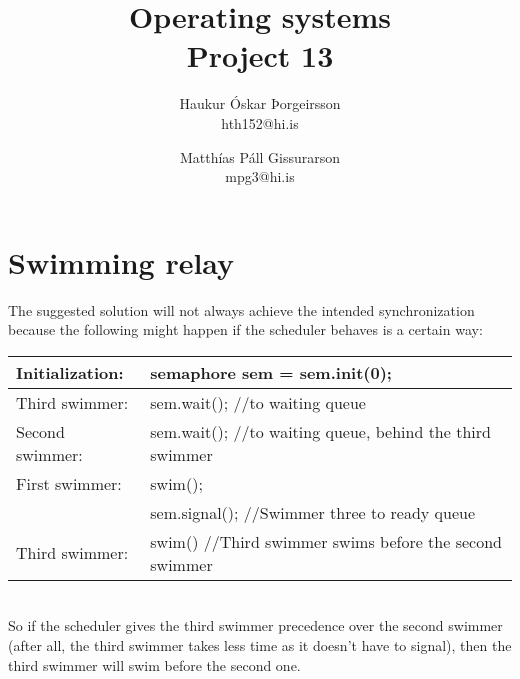 \documentclass[10pt,a4paper]{article}
\begin{document}
\title{Operating systems\\Project 13}
\author{
    Haukur Óskar Þorgeirsson\\
    hth152@hi.is \and
    Matthías Páll Gissurarson\\
    mpg3@hi.is}
\maketitle

\section{Swimming relay}

The suggested solution will not always achieve the intended synchronization because the following might happen if the scheduler behaves is a certain way:\\

\begin{tabular}{|ll|}
\hline
Initialization:&semaphore sem = sem.init(0);\\
\hline
Third swimmer:&sem.wait(); //to waiting queue\\ \hline
Second swimmer:&sem.wait(); //to waiting queue, behind the third swimmer\\ \hline
First swimmer:&swim();\\
&sem.signal(); //Swimmer three to ready queue\\ \hline
Third swimmer:&swim() //Third swimmer swims before the second swimmer\\ \hline
\end{tabular}\\

So if the scheduler gives the third swimmer precedence over the second swimmer (after all, the third swimmer takes less time as it doesn't have to signal), then the third swimmer will swim before the second one.
\end{document}
